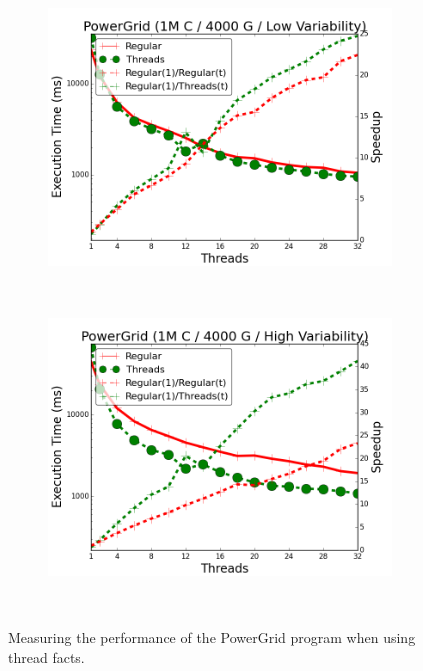 \begin{figure}[]
        \begin{subfigure}[b]{\plotsize\textwidth}
           \includegraphics[width=\textwidth]{experiments/threads/cmp-powergrid-1M4000C-low.png}
           \caption{}
           \label{fig:threads:powergrid3}
        \end{subfigure} ~
        \begin{subfigure}[b]{\plotsize\textwidth}
           \includegraphics[width=\textwidth]{experiments/threads/cmp-powergrid-1M4000C-high.png}
           \caption{}
           \label{fig:threads:powergrid4}
        \end{subfigure} \\
        \caption{Measuring the performance of the PowerGrid program
        when using thread facts.}
        \label{fig:threads:results_powergrid}
\end{figure}

